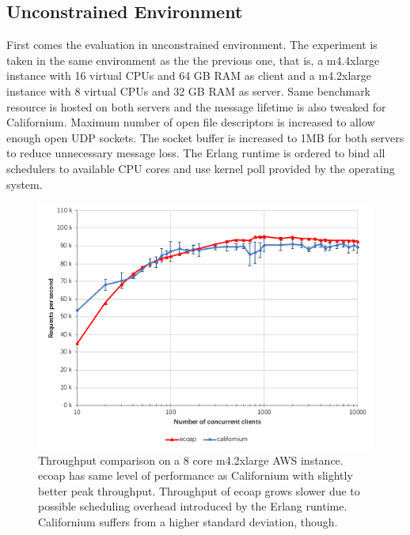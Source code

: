 \subsection{Unconstrained Environment}

First comes the evaluation in unconstrained environment. The experiment is taken in the same environment as the the previous one, that is, a m4.4xlarge instance with 16 virtual CPUs and 64 GB RAM as client and a m4.2xlarge instance with 8 virtual CPUs and 32 GB RAM as server. Same benchmark resource is hosted on both servers and the message lifetime is also tweaked for Californium. Maximum number of open file descriptors is increased to allow enough open UDP sockets. The socket buffer is increased to 1MB for both servers to reduce unnecessary message loss. The Erlang runtime is ordered to bind all schedulers to available CPU cores and use kernel poll provided by the operating system. 

\begin{figure}[!htbp]
\centering
\includegraphics[scale = 0.8]{throughput}
\caption[Throughput comparison on a 8 core m4.2xlarge AWS instance]{Throughput comparison on a 8 core m4.2xlarge AWS instance. ecoap has same level of performance as Californium with slightly better peak throughput. Throughput of ecoap grows slower due to possible scheduling overhead introduced by the Erlang runtime. Californium suffers from a higher standard deviation, though.}
\label{fig:throughput}
\end{figure}

